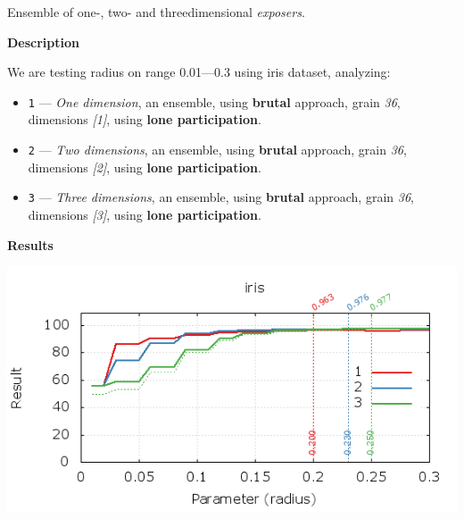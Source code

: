 \begin{experiment}{Ensemble of one-, two- and threedimensional \emph{exposers}.}{\small \sffamily\textbf{Description}

We are testing radius on range 0.01---0.3 using iris dataset, analyzing:

\begin{itemize}
\tightlist
	\item \texttt{1} --- \emph{One dimension}, an ensemble, using \textbf{brutal} approach, grain \emph{36}, dimensions \emph{[1]}, using \textbf{lone participation}.
	\item \texttt{2} --- \emph{Two dimensions}, an ensemble, using \textbf{brutal} approach, grain \emph{36}, dimensions \emph{[2]}, using \textbf{lone participation}.
	\item \texttt{3} --- \emph{Three dimensions}, an ensemble, using \textbf{brutal} approach, grain \emph{36}, dimensions \emph{[3]}, using \textbf{lone participation}.

\end{itemize}


\textbf{Results}

\centering
	\includegraphics[width=.75\textwidth]{plots/experiment_6_iris.png}
	\label{fig:experiment_6}
}\end{experiment}